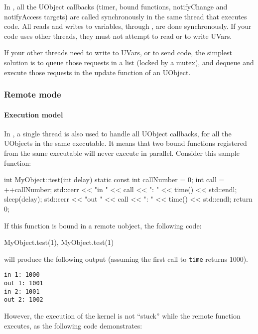 In , all the UObject callbacks (timer, bound
functions, notifyChange and notifyAccess targets) are called
synchronously in the same thread that executes \us code. All reads and
writes to \urbi variables, through , are done
synchronously.  If
your code uses other threads, they must not attempt to read or to
write UVars.

If your other threads need to write to UVars, or to send \us code, the
simplest solution is to queue those requests in a list (locked by a
mutex), and dequeue and execute those requests in the update function
of an UObject.

\subsubsection{Remote mode}

\paragraph{Execution model}

In , a single thread is also used to handle all
UObject callbacks, for all the UObjects in the same executable. It
means that two bound functions registered from the same executable
will never execute in parallel. Consider this sample \Cxx function:

\begin{cxx}
int MyObject::test(int delay)
{
  static const int callNumber = 0;
  int call = ++callNumber;
  std::cerr << "in "  << call << ": " << time() << std::endl;
  sleep(delay);
  std::cerr << "out " << call << ": " << time() << std::endl;
  return 0;
}
\end{cxx}

If this function is bound in a remote uobject, the following code:

\begin{cxx}
MyObject.test(1), MyObject.test(1)
\end{cxx}

\noindent
will produce the following output (assuming the first call to
\lstinline|time| returns 1000).

\begin{lstlisting}
in 1: 1000
out 1: 1001
in 2: 1001
out 2: 1002
\end{lstlisting}

However, the execution of the \urbi kernel is not ``stuck'' while the
remote function executes, as the following code demonstrates:

